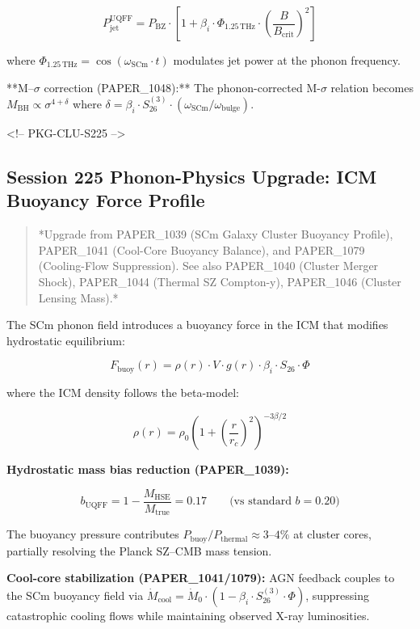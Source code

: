 \documentclass[11pt]{article}
\begin{document}
$$P_{\text{jet}}^{\text{UQFF}} = P_{\text{BZ}} \cdot \left[1 + \beta_i \cdot \Phi_{1.25\,\text{THz}} \cdot \left(\frac{B}{B_{\text{crit}}}\right)^2\right]$$

where $\Phi_{1.25\,\text{THz}} = \cos(\omega_{\text{SCm}} \cdot t)$ modulates jet power at the phonon frequency.

**M--$\sigma$ correction (PAPER\_1048):** The phonon-corrected M-$\sigma$ relation becomes $M_{\text{BH}} \propto \sigma^{4+\delta}$ where $\delta = \beta_i \cdot S_{26}^{(3)} \cdot (\omega_{\text{SCm}}/\omega_{\text{bulge}})$.

<!-- PKG-CLU-S225 -->

\subsection*{Session 225 Phonon-Physics Upgrade: ICM Buoyancy Force Profile}

\begin{quote}
*Upgrade from PAPER\_1039 (SCm Galaxy Cluster Buoyancy Profile),
PAPER\_1041 (Cool-Core Buoyancy Balance), and PAPER\_1079 (Cooling-Flow
Suppression).  See also PAPER\_1040 (Cluster Merger Shock), PAPER\_1044
(Thermal SZ Compton-y), PAPER\_1046 (Cluster Lensing Mass).*
\end{quote}

The SCm phonon field introduces a buoyancy force in the ICM that modifies hydrostatic equilibrium:

$$F_{\text{buoy}}(r) = \rho(r) \cdot V \cdot g(r) \cdot \beta_i \cdot S_{26} \cdot \Phi$$

where the ICM density follows the beta-model:

$$\rho(r) = \rho_0 \left(1 + \left(\frac{r}{r_c}\right)^2\right)^{-3\beta/2}$$

\textbf{Hydrostatic mass bias reduction (PAPER\_1039):}

$$b_{\text{UQFF}} = 1 - \frac{M_{\text{HSE}}}{M_{\text{true}}} = 0.17 \qquad \text{(vs standard } b = 0.20\text{)}$$

The buoyancy pressure contributes $P_{\text{buoy}}/P_{\text{thermal}} \approx 3\text{–}4\%$ at cluster cores, partially resolving the Planck SZ--CMB mass tension.

\textbf{Cool-core stabilization (PAPER\_1041/1079):} AGN feedback couples to the SCm buoyancy field via $\dot{M}_{\text{cool}} = \dot{M}_0 \cdot (1 - \beta_i \cdot S_{26}^{(3)} \cdot \Phi)$, suppressing catastrophic cooling flows while maintaining observed X-ray luminosities.
\end{document}
